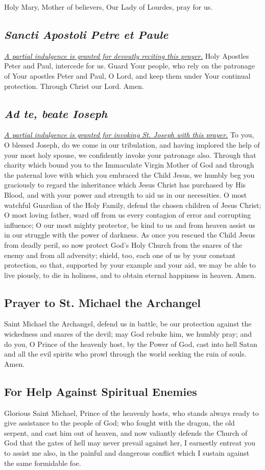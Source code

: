 \documentclass[12pt]{article}
\newcommand{\prayertitle}[1]{\subsection{#1}}
\newcommand{\indulgencedprayertitle}[1]{\prayertitle{#1 \protect\kreuz}}
\newcommand{\emphasis}[1]{\emph{#1}}
\newcommand{\emphasis}[1]{\textsl{#1}}
\newcommand{\foreign}[1]{\emphasis{#1}}
\newcommand{\note}[1]{{\small{\emphasis{#1}}}\newline}
\newcommand{\linkednote}[2]{\hyperlink{#1}{\note{#2}}}
\begin{document}
Holy Mary, Mother of believers, Our Lady of Lourdes, pray for us.

\indulgencedprayertitle{\foreign{Sancti Apostoli Petre et Paule}}
\linkednote{grant20}{A partial indulgence is granted for devoutly reciting this prayer.}
Holy Apostles Peter and Paul, intercede for us.
Guard Your people, who rely on the patronage of Your apostles Peter and Paul, O Lord, and keep them under Your continual protection.
Through Christ our Lord. Amen.

\indulgencedprayertitle{\foreign{Ad te, beate Ioseph}}
\linkednote{grant19}{A partial indulgence is granted for invoking St. Joseph with this prayer.}
To you, O blessed Joseph, do we come in our tribulation, and having implored the help of your most holy spouse, we confidently invoke your patronage also.
Through that charity which bound you to the Immaculate Virgin Mother of God and through the paternal love with which you embraced the Child Jesus, we humbly beg you graciously to regard the inheritance which Jesus Christ has purchased by His Blood, and with your power and strength to aid us in our necessities.
O most watchful Guardian of the Holy Family, defend the chosen children of Jesus Christ;
O most loving father, ward off from us every contagion of error and corrupting influence;
O our most mighty protector, be kind to us and from heaven assist us in our struggle with the power of darkness.
As once you rescued the Child Jesus from deadly peril, so now protect God's Holy Church from the snares of the enemy and from all adversity;
shield, too, each one of us by your constant protection, so that, supported by your example and your aid, we may be able to live piously, to die in holiness, and to obtain eternal happiness in heaven.
Amen.

\prayertitle{Prayer to St. Michael the Archangel}
\label{prayer:StMichael}
Saint Michael the Archangel, defend us in battle, be our protection against the wickedness and snares of the devil;
may God rebuke him, we humbly pray;
and do you, O Prince of the heavenly host, by the Power of God, cast into hell Satan and all the evil spirits who prowl through the world seeking the ruin of souls.
Amen.

\prayertitle{For Help Against Spiritual Enemies}
\label{prayer:help_against_spiritual_enemies}
Glorious Saint Michael, Prince of the heavenly hosts, who stands always ready to give assistance to the people of God;
who fought with the dragon, the old serpent, and cast him out of heaven, and now valiantly defends the Church of God that the gates of hell may never prevail against her, I earnestly entreat you to assist me also, in the painful and dangerous conflict which I sustain against the same formidable foe.
\end{document}
